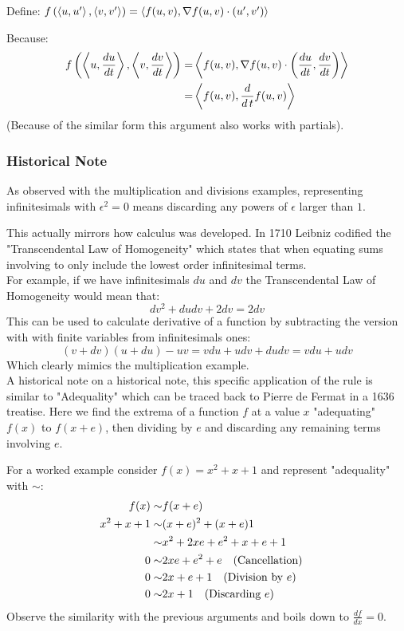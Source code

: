 Define:
$f\left(\left\langle u,u' \right\rangle,\left\langle v,v' \right\rangle\right) = \left\langle f(u,v),\nabla f(u,v) \cdot (u',v') \right\rangle$

Because:
\begin{equation*}
\begin{aligned}
	f\left(\left\langle u,\frac{du}{dt} \right\rangle,\left\langle v,\frac{dv}{dt} \right\rangle\right) =& \left\langle f(u,v),\nabla f(u,v) \cdot \left(\frac{du}{dt},\frac{dv}{dt}\right) \right\rangle \\
	=& \left\langle f(u,v),\frac{d}{d\,t}f(u,v) \right\rangle \\
\end{aligned}
\end{equation*}
(Because of the similar form this argument also works with partials).

\subsubsection{Historical Note}
As observed with the multiplication and divisions examples,
representing infinitesimals with $\epsilon^2 = 0$ means discarding any powers of $\epsilon$ larger than $1$.

This actually mirrors how calculus was developed.
In 1710 Leibniz codified the "Transcendental Law of Homogeneity" which states that when equating sums involving to only include the lowest order infinitesimal terms.
\\

For example,
if we have infinitesimals $du$ and $dv$ the Transcendental Law of Homogeneity would mean that:
\[dv^2+dudv+2dv = 2dv\]
This can be used to calculate derivative of a function by subtracting the version with with finite variables from infinitesimals ones: 
\[(v+dv)(u+du)-uv = vdu+udv+dudv= vdu+udv\]
Which clearly mimics the multiplication example.
\\

A historical note on a historical note,
this specific application of the rule is similar to "Adequality" which can be traced back to Pierre de Fermat in a 1636 treatise.
Here we find the extrema of a function $f$ at a value $x$ "adequating" $f(x)$ to $f(x+e)$, 
then dividing by $e$ and discarding any remaining terms involving $e$.

For a worked example consider $f(x)=x^2+x+1$ and represent "adequality" with $\sim$:
\begin{equation*}
\begin{aligned}
	f(x)\sim&f(x+e)\\
	x^2+x+1\sim& (x+e)^2+(x+e)1\\
	\sim&x^2+2xe+e^2+x+e+1&\\
	0\sim& 2xe+e^2+e \text{\quad (Cancellation)}\\
	0\sim& 2x+e+1 \text{\quad (Division by $e$)}\\
	0\sim& 2x+1 \text{\quad (Discarding $e$)}\\
\end{aligned}
\end{equation*}
Observe the similarity with the previous arguments and boils down to $\frac{df}{dx}=0$.
\\

